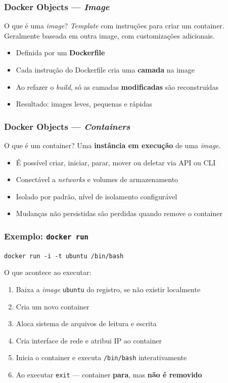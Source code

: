 \begin{frame}
  \frametitle{Docker Objects — \textit{Image}}
  \begin{block}{O que é uma \textit{image}?}
    \textit{Template} com instruções para criar um container. Geralmente baseada em
    outra image, com customizações adicionais.
  \end{block}

  \vspace{0.5em}
  \begin{itemize}
    \item Definida por um \textbf{Dockerfile}
    \item Cada instrução do Dockerfile cria uma \textbf{camada} na image
    \item Ao refazer o \textit{build}, só as camadas \textbf{modificadas} são reconstruídas
    \item Resultado: images leves, pequenas e rápidas
  \end{itemize}
\end{frame}

\begin{frame}
  \frametitle{Docker Objects — \textit{Containers}}
  \begin{block}{O que é um container?}
    Uma \textbf{instância em execução} de uma \textit{image}.
  \end{block}

  \vspace{0.5em}
  \begin{itemize}
    \item É possível criar, iniciar, parar, mover ou deletar via API ou CLI
    \item Conectável a \textit{networks} e volumes de armazenamento
    \item Isolado por padrão, nível de isolamento configurável
    \item \alert{Mudanças não persistidas são perdidas quando remove o container}
  \end{itemize}
\end{frame}

\begin{frame}
  \frametitle{Exemplo: \texttt{docker run}}
  \texttt{docker run -i -t ubuntu /bin/bash}

  \vspace{0.5em}
  O que acontece ao executar:

  \begin{enumerate}
    \item<2-> Baixa a \textit{image} \texttt{ubuntu} do registro, se não existir localmente
    \item<3-> Cria um novo container
    \item<4-> Aloca sistema de arquivos de leitura e escrita
    \item<5-> Cria interface de rede e atribui IP ao container
    \item<6-> Inicia o container e executa \texttt{/bin/bash} interativamente
    \item<7-> Ao executar \texttt{exit} — container \textbf{para}, mas \textbf{não é removido}
  \end{enumerate}
\end{frame}